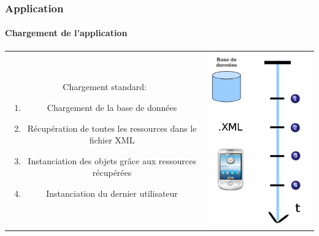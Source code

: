 	
	\begin{frame}
	\frametitle{Application}
	\framesubtitle{Chargement de l'application}
	\begin{center}
		\begin{tabular}{cc}
			\begin{minipage}{8cm}
				Chargement standard:
				\begin{enumerate}
					\item Chargement de la base de données
					\item Récupération de toutes les ressources dans le fichier XML
					\item Instanciation des objets grâce aux ressources récupérées
					\item Instanciation du dernier utilisateur
				\end{enumerate}
			\end{minipage} &
			\begin{minipage}{4cm}
				 \includegraphics[scale=0.35]{img/sequence_demarrage2.png}
			\end{minipage}\\
		\end{tabular}
	\end{center}
	
	\end{frame}


